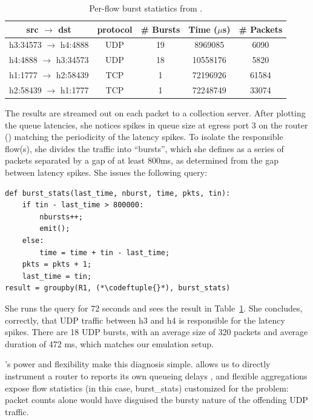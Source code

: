 \begin{table}[t]
\centering
\small
\begin{tabular}{|c|c|c|c|c|} \hline
\bf{src $\rightarrow$ dst} & \bf{protocol} & \bf{\# Bursts} & \bf{Time ($\mu$s)} & \bf{\# Packets} \\ \hline
h3:34573 $\rightarrow$ h4:4888 & UDP & 19 & 8969085 & 6090 \\
h4:4888 $\rightarrow$ h3:34573 & UDP & 18 & 10558176 & 5820 \\
h1:1777 $\rightarrow$ h2:58439 & TCP & 1 & 72196926 & 61584 \\
h2:58439 $\rightarrow$ h1:1777 & TCP & 1 & 72248749 & 33074 \\ \hline
\end{tabular}
\caption{Per-flow burst statistics from \TheSystem.}
\label{t:mininet-flowstats}
\vspace{-0.1in}
\end{table}

The results are streamed out on each packet to a collection server. After
plotting the queue latencies, she notices spikes in queue size at egress port 3
on the router () matching the periodicity of the latency
spikes. To isolate the responsible flow(s), she divides the traffic into
``bursts'', which she defines as a series of packets separated by a gap of at
least 800ms, as determined from the gap between latency spikes. She issues the
following \TheSystem query:

\begin{small}
\begin{lstlisting}
def burst_stats(last_time, nburst, time, pkts, tin):
    if tin - last_time > 800000:
        nbursts++;
        emit();
    else:
        time = time + tin - last_time;
    pkts = pkts + 1;
    last_time = tin;
result = groupby(R1, (*\codeftuple{}*), burst_stats)
\end{lstlisting}
\end{small}


She runs the query for 72 seconds and sees the result in
Table~\ref{t:mininet-flowstats}. She concludes, correctly, that UDP traffic
between {\ct h3} and {\ct h4} is responsible for the latency spikes.
There are 18 UDP bursts, with an average size of 320 packets and
average duration of 472 ms, which matches our emulation setup.

\TheSystem's power and flexibility make this diagnosis simple. \TheSystem
allows us to directly instrument a router to reports its own queueing delays
, and flexible
aggregations expose flow statistics (in this case, {\ct burst\_stats}) customized for the problem:
packet counts alone would have disguised the bursty nature of
the offending UDP traffic.

